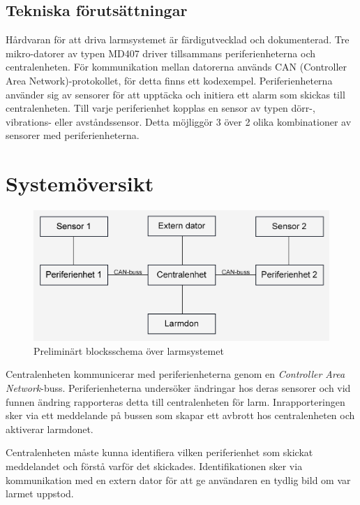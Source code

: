 \documentclass[a4paper]{article}
\begin{document}
\subsection{Tekniska förutsättningar}

Hårdvaran för att driva larmsystemet är färdigutvecklad och dokumenterad. Tre mikro-datorer av typen MD407 driver tillsammans periferienheterna och centralenheten. För kommunikation mellan datorerna används CAN (Controller Area Network)-protokollet, för detta finns ett kodexempel. Periferienheterna använder sig av sensorer för att upptäcka och initiera ett alarm som skickas till centralenheten. Till varje periferienhet kopplas en sensor av typen dörr-, vibrations- eller avståndssensor. Detta möjliggör 3 över 2 olika kombinationer av sensorer med periferienheterna.


\section{Systemöversikt}

\begin{figure}[H]
    \centering
    \includegraphics[width=\textwidth]{blockschema.png}
    \caption{Preliminärt blocksschema över larmsystemet}
\end{figure}

Centralenheten kommunicerar med periferienheterna genom en \textit{Controller Area Network}-buss. Periferienheterna undersöker ändringar hos deras sensorer och vid funnen ändring rapporteras detta till centralenheten för larm. Inrapporteringen sker via ett meddelande på bussen som skapar ett avbrott hos centralenheten och aktiverar larmdonet.

Centralenheten måste kunna identifiera vilken periferienhet som skickat meddelandet och förstå varför det skickades. Identifikationen sker via kommunikation med en extern dator för att ge användaren en tydlig bild om var larmet uppstod.
\end{document}
